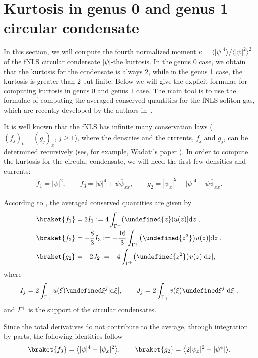 \documentclass[pdftex]{sigma}
\numberwithin{equation}{section}
\let\Im\undefined
\DeclareMathOperator{\Im}{Im}
\newcommand{\G}{\Gamma}
\def\G{\Gamma}
\begin{document}
\section{Kurtosis in genus 0 and genus 1 circular condensate}\label{sec-kurt}

In this section, we will compute the fourth normalized moment $\kappa=\bigl\langle|\psi|^4\bigr\rangle/\bigl\langle|\psi|^2\bigr\rangle^2$ of the fNLS circular condensate $|\psi|$-the kurtosis. In the genus 0 case, we obtain that the kurtosis for the condensate is always 2, while in the genus 1 case, the kurtosis is greater than 2 but finite. Below we will give the explicit formulae for computing kurtosis in genus 0 and genus 1 case. The main tool is to use the formulae of computing the averaged conserved quantities for the fNLS soliton gas, which are recently developed by the authors in~\cite{TW}.

It is well known that the fNLS has infinite many conservation laws ($(f_j)_t=(g_j)_x$, $j\geq 1$), where the densities and the currents, $f_j$ and $g_j$, can be determined recursively (see, for example, Wadati's paper \cite{Wadati}). In order to compute the kurtosis for the circular condensate, we will need the first few densities and currents:
\begin{align*}
f_1=|\psi|^2,\qquad
f_3=|\psi|^4+\psi\overline{\psi}_{xx},\qquad
g_2=|\psi_x|^2-|\psi|^4-\psi\overline{\psi}_{xx}.
\end{align*}

According to \cite{TW}, the averaged conserved quantities are given by
\begin{align*}
&\braket{f_1}=2I_1:=4\int_{\G^+}(\Im{z})u(z)|{\rm d}z|,\\
&\braket{f_3}=-\frac{8}{3}I_3:=-\frac{16}{3}\int_{\G^+}\bigl(\Im{z^3}\bigr)u(z)|{\rm d}z|,\\
&\braket{g_2}=-2J_2:=-4\int_{\G^+}\bigl(\Im{z^2}\bigr)v(z)|{\rm d}z|,
\end{align*}
where
\begin{align}
I_j=2\int_{\Gamma_+}u(\xi)\Im \xi^j|{\rm d}\xi|,\label{eq:Ij}\qquad
J_j=2\int_{\Gamma_+}v(\xi)\Im \xi^j|{\rm d}\xi|,
\end{align}
and $\G^+$ is the support of the circular condensates.

Since the total derivatives do not contribute to the average, through integration by parts, the following identities follow
\begin{align*}
\braket{f_3}=\bigl\langle|\psi|^4-|\psi_x|^2\bigr\rangle,\qquad
\braket{g_2}=\bigl\langle 2|\psi_x|^2-|\psi^4|\bigr\rangle.
\end{align*}
\end{document}
